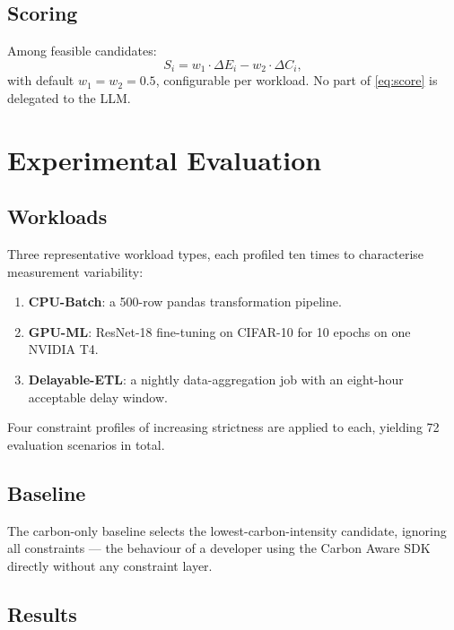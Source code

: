 ﻿\documentclass[conference]{IEEEtran}
\begin{document}
\subsection{Scoring}

Among feasible candidates:
\begin{equation}
S_i = w_1 \cdot \Delta E_i - w_2 \cdot \Delta C_i,\label{eq:score}
\end{equation}
with default $w_1 = w_2 = 0.5$, configurable per workload.
No part of \eqref{eq:score} is delegated to the LLM.

\section{Experimental Evaluation}

\subsection{Workloads}

Three representative workload types, each profiled ten times to characterise
measurement variability:
\begin{enumerate}
\item \textbf{CPU-Batch}: a 500-row pandas transformation pipeline.
\item \textbf{GPU-ML}: ResNet-18 fine-tuning on CIFAR-10 for 10 epochs on
one NVIDIA T4.
\item \textbf{Delayable-ETL}: a nightly data-aggregation job with an eight-hour
acceptable delay window.
\end{enumerate}
Four constraint profiles of increasing strictness are applied to each,
yielding 72 evaluation scenarios in total.

\subsection{Baseline}

The carbon-only baseline selects the lowest-carbon-intensity candidate, ignoring
all constraints --- the behaviour of a developer using the Carbon Aware SDK directly
without any constraint layer.

\subsection{Results}
\end{document}
